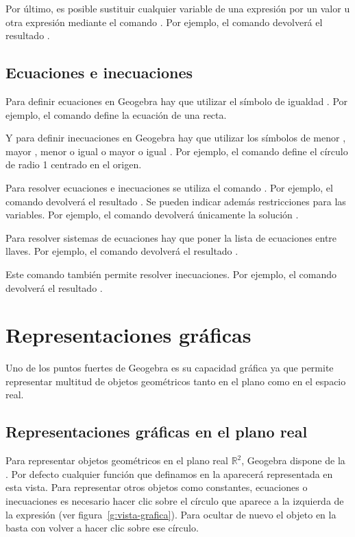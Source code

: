 Por último, es posible sustituir cualquier variable de una expresión por un valor u otra expresión mediante el comando .
Por ejemplo, el comando  devolverá el resultado .

\subsection*{Ecuaciones e inecuaciones}
Para definir ecuaciones en Geogebra hay que utilizar el símbolo de igualdad \command{=}.
Por ejemplo, el comando  define la ecuación de una recta.

Y para definir inecuaciones en Geogebra hay que utilizar los símbolos de menor \command{<}, mayor \command{>}, menor o igual \command{<=} o mayor o igual \command{>=}.
Por ejemplo, el comando  define el círculo de radio 1 centrado en el origen.

Para resolver ecuaciones e inecuaciones se utiliza el comando .
Por ejemplo, el comando  devolverá el resultado .
Se pueden indicar además restricciones para las variables.
Por ejemplo, el comando  devolverá únicamente la solución .

Para resolver sistemas de ecuaciones hay que poner la lista de ecuaciones entre llaves.
Por ejemplo, el comando  devolverá el resultado .

Este comando también permite resolver inecuaciones.
Por ejemplo, el comando  devolverá el resultado .


\section{Representaciones gráficas}
Uno de los puntos fuertes de Geogebra es su capacidad gráfica ya que permite representar multitud de objetos geométricos tanto en el plano como en el espacio real.

\subsection*{Representaciones gráficas en el plano real}
Para representar objetos geométricos en el plano real $\mathbb{R}^2$, Geogebra dispone de la .
Por defecto cualquier función que definamos en la  aparecerá representada en esta vista.
Para representar otros objetos como constantes, ecuaciones o inecuaciones es necesario hacer clic sobre el círculo que aparece a la izquierda de la expresión (ver figura~\ref{g:vista-grafica}).
Para ocultar de nuevo el objeto en la  basta con volver a hacer clic sobre ese círculo.

